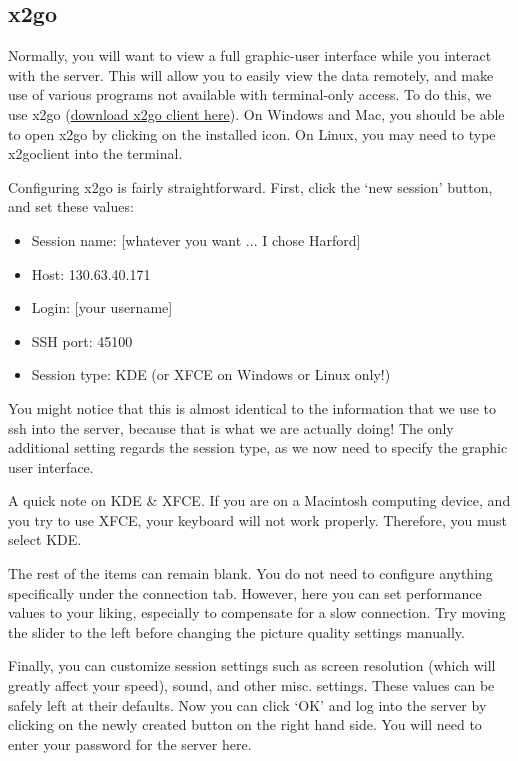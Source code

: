 \documentclass[final,titlepage,letterpaper,oneside,12pt]{article}
\renewcommand{\texttt}[2][BrickRed]{\textcolor{#1}{\ttfamily #2}}%
\begin{document}
\subsection{x2go}

Normally, you will want to view a full graphic-user interface while you interact with the server. This will allow you to easily view the data remotely, and make use of various programs not available with terminal-only access. To do this, we use x2go (\href{http://wiki.x2go.org/doku.php}{download x2go client here}). On Windows and Mac, you should be able to open x2go by clicking on the installed icon. On Linux, you may need to type \texttt{x2goclient} into the terminal.

Configuring x2go is fairly straightforward. First, click the `new session' button, and set these values:

\begin{itemize} \itemsep-2pt
    \item{Session name: [whatever you want ... I chose Harford]}
    \item{Host: 130.63.40.171}
    \item{Login: [your username]}
    \item{SSH port: 45100}
    \item{Session type: KDE (or XFCE on Windows or Linux only!)}
\end{itemize}

You might notice that this is almost identical to the information that we use to \texttt{ssh} into the server, because that is what we are actually doing! The only additional setting regards the \texttt{session type}, as we now need to specify the graphic user interface.

A quick note on KDE \& XFCE. If you are on a Macintosh computing device, and you try to use XFCE, your keyboard will not work properly. Therefore, you must select KDE.  

The rest of the items can remain blank. You do not need to configure anything specifically under the connection tab. However, here you can set performance values to your liking, especially to compensate for a slow connection. Try moving the slider to the left before changing the picture quality settings manually.

Finally, you can customize session settings such as screen resolution (which will greatly affect your speed), sound, and other misc. settings. These values can be safely left at their defaults. Now you can click `OK' and log into the server by clicking on the newly created button on the right hand side. You will need to enter your password for the server here.
\end{document}
